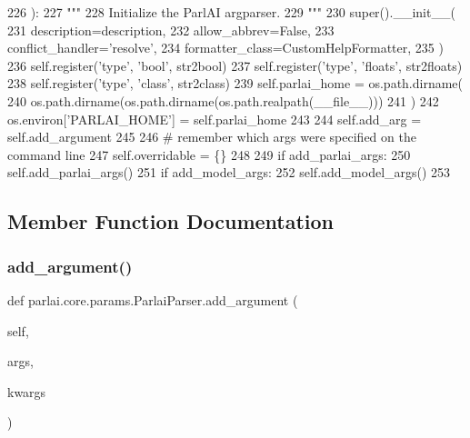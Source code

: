 \begin{DoxyCode}
226     ):
227         \textcolor{stringliteral}{"""}
228 \textcolor{stringliteral}{        Initialize the ParlAI argparser.}
229 \textcolor{stringliteral}{        """}
230         super().\_\_init\_\_(
231             description=description,
232             allow\_abbrev=\textcolor{keyword}{False},
233             conflict\_handler=\textcolor{stringliteral}{'resolve'},
234             formatter\_class=CustomHelpFormatter,
235         )
236         self.register(\textcolor{stringliteral}{'type'}, \textcolor{stringliteral}{'bool'}, str2bool)
237         self.register(\textcolor{stringliteral}{'type'}, \textcolor{stringliteral}{'floats'}, str2floats)
238         self.register(\textcolor{stringliteral}{'type'}, \textcolor{stringliteral}{'class'}, str2class)
239         self.parlai\_home = os.path.dirname(
240             os.path.dirname(os.path.dirname(os.path.realpath(\_\_file\_\_)))
241         )
242         os.environ[\textcolor{stringliteral}{'PARLAI\_HOME'}] = self.parlai\_home
243 
244         self.add\_arg = self.add\_argument
245 
246         \textcolor{comment}{# remember which args were specified on the command line}
247         self.overridable = \{\}
248 
249         \textcolor{keywordflow}{if} add\_parlai\_args:
250             self.add\_parlai\_args()
251         \textcolor{keywordflow}{if} add\_model\_args:
252             self.add\_model\_args()
253 
\end{DoxyCode}


\subsection{Member Function Documentation}
\mbox{\label{classparlai_1_1core_1_1params_1_1ParlaiParser_a3ecf246ac5ed40769d313a2db962b43e}} 
\subsubsection{\texorpdfstring{add\+\_\+argument()}{add\_argument()}}
{\footnotesize\ttfamily def parlai.\+core.\+params.\+Parlai\+Parser.\+add\+\_\+argument (\begin{DoxyParamCaption}\item[{}]{self,  }\item[{}]{args,  }\item[{}]{kwargs }\end{DoxyParamCaption})}

